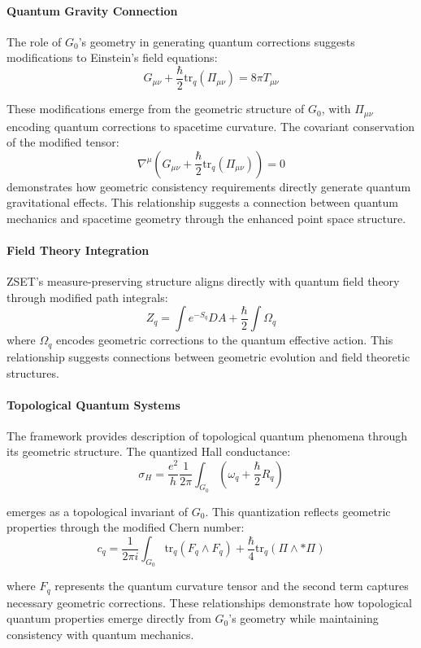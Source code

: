 \documentclass[10pt]{article}
\begin{document}
\paragraph{Quantum Gravity Connection}

The role of $G_0$'s geometry in generating quantum corrections suggests modifications to Einstein's field equations:
\[
G_{\mu\nu} + \frac{\hbar}{2}\text{tr}_q(\Pi_{\mu\nu}) = 8\pi T_{\mu\nu}
\]

These modifications emerge from the geometric structure of $G_0$, with $\Pi_{\mu\nu}$ encoding quantum corrections to spacetime curvature. The covariant conservation of the modified tensor:
\[
\nabla^\mu(G_{\mu\nu} + \frac{\hbar}{2}\text{tr}_q(\Pi_{\mu\nu})) = 0
\]
demonstrates how geometric consistency requirements directly generate quantum gravitational effects. This relationship suggests a connection between quantum mechanics and spacetime geometry through the enhanced point space structure.

\paragraph{Field Theory Integration}

ZSET's measure-preserving structure aligns directly with quantum field theory through modified path integrals:
\[
Z_q = \int e^{-S_q} DA + \frac{\hbar}{2} \int \Omega_q
\]
where \(\Omega_q\) encodes geometric corrections to the quantum effective action. This relationship suggests connections between geometric evolution and field theoretic structures.

\paragraph{Topological Quantum Systems}

The framework provides description of topological quantum phenomena through its geometric structure. The quantized Hall conductance:
\[
\sigma_H = \frac{e^2}{h}\frac{1}{2\pi} \int_{G_0} \left( \omega_q + \frac{\hbar}{2}R_q \right)
\]

emerges as a topological invariant of $G_0$. This quantization reflects geometric properties through the modified Chern number:
\[
c_q = \frac{1}{2\pi i}\int_{G_0} \text{tr}_q(F_q \wedge F_q) + \frac{\hbar}{4}\text{tr}_q(\Pi \wedge *\Pi)
\]

where $F_q$ represents the quantum curvature tensor and the second term captures necessary geometric corrections. These relationships demonstrate how topological quantum properties emerge directly from $G_0$'s geometry while maintaining consistency with quantum mechanics.
\end{document}
